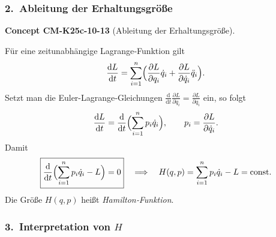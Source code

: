 \documentclass[10pt, letterpaper]{article}
\newcommand{\CustomHeading}[3]{%
  \par\medskip\noindent%
  \textbf{#1 #2} \textnormal{(#3)}.\enskip%
}
\newenvironment{CONC}[2]{\begin{unitbox}\CustomHeading{Concept}{#1}{#2}}{\end{unitbox}}
\begin{document}
\subsubsection*{2.\ Ableitung der Erhaltungsgröße}

\begin{CONC}{CM-K25c-10-13}{Ableitung der Erhaltungsgröße}
Für eine zeitunabhängige Lagrange‐Funktion gilt
\[
  \frac{\mathrm dL}{\mathrm dt}
  =\sum_{i=1}^{n}
     \Bigl(
       \frac{\partial L}{\partial q_i}\dot q_i
      +\frac{\partial L}{\partial\dot q_i}\ddot q_i
     \Bigr).
\]
Setzt man die Euler-Lagrange‐Gleichungen
$\tfrac{\mathrm d}{\mathrm dt}\tfrac{\partial L}{\partial\dot q_i}
 =\tfrac{\partial L}{\partial q_i}$ ein, so folgt
\[
  \frac{\mathrm dL}{\mathrm dt}
  =\frac{\mathrm d}{\mathrm dt}
     \Bigl(
       \sum_{i=1}^{n}p_i\dot q_i
     \Bigr),
  \qquad
  p_i=\frac{\partial L}{\partial\dot q_i}.
\]
Damit
\[
  \boxed{%
    \frac{\mathrm d}{\mathrm dt}
    \Bigl(
      \sum_{i=1}^{n}p_i\dot q_i - L
    \Bigr)=0
  }
  \quad\Longrightarrow\quad
  H(q,p)=\sum_{i=1}^{n}p_i\dot q_i-L=\text{const.}
\]
Die Größe
\(H(q,p)\) heißt \emph{Hamilton‐Funktion}.
\end{CONC}

\subsubsection*{3.\ Interpretation von $H$}
\end{document}

